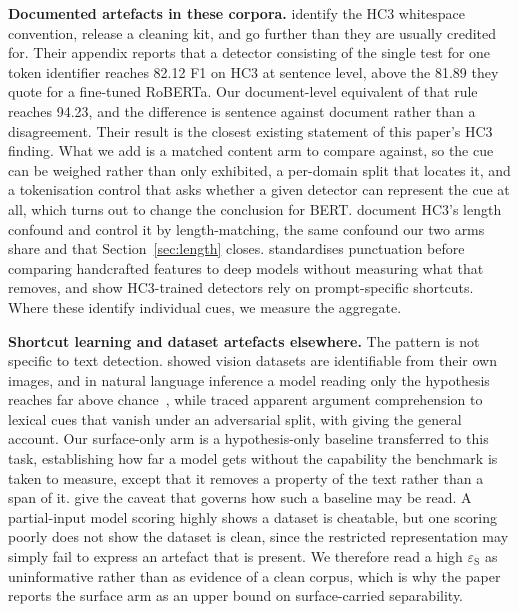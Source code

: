\textbf{Documented artefacts in these corpora.} \citet{Tian2023multiscale} identify the HC3 whitespace convention, release a cleaning kit, and go further than they are usually credited for. Their appendix reports that a detector consisting of the single test for one token identifier reaches 82.12 F1 on HC3 at sentence level, above the 81.89 they quote for a fine-tuned RoBERTa. Our document-level equivalent of that rule reaches 94.23, and the difference is sentence against document rather than a disagreement. Their result is the closest existing statement of this paper's HC3 finding. What we add is a matched content arm to compare against, so the cue can be weighed rather than only exhibited, a per-domain split that locates it, and a tokenisation control that asks whether a given detector can represent the cue at all, which turns out to change the conclusion for BERT. \citet{Baidya2026detecting} document HC3's length confound and control it by length-matching, the same confound our two arms share and that Section~\ref{sec:length} closes. \citet{Ardeshirifar2025comparing} standardises punctuation before comparing handcrafted features to deep models without measuring what that removes, and \citet{Park2024investigating} show HC3-trained detectors rely on prompt-specific shortcuts. Where these identify individual cues, we measure the aggregate.

\textbf{Shortcut learning and dataset artefacts elsewhere.} The pattern is not specific to text detection. \citet{Torralba2011unbiased} showed vision datasets are identifiable from their own images, and in natural language inference a model reading only the hypothesis reaches far above chance~\cite{Gururangan2018annotation,Poliak2018hypothesis}, while \citet{Niven2019probing} traced apparent argument comprehension to lexical cues that vanish under an adversarial split, with \citet{Geirhos2020shortcut} giving the general account. Our surface-only arm is a hypothesis-only baseline transferred to this task, establishing how far a model gets without the capability the benchmark is taken to measure, except that it removes a property of the text rather than a span of it. \citet{Feng2019misleading} give the caveat that governs how such a baseline may be read. A partial-input model scoring highly shows a dataset is cheatable, but one scoring poorly does not show the dataset is clean, since the restricted representation may simply fail to express an artefact that is present. We therefore read a high $\varepsilon_{\mathrm{S}}$ as uninformative rather than as evidence of a clean corpus, which is why the paper reports the surface arm as an upper bound on surface-carried separability.

